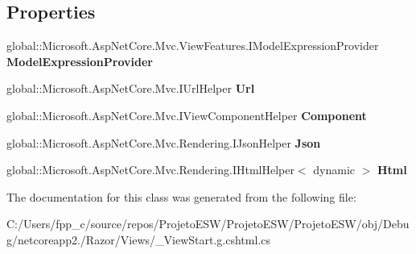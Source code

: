 \subsection*{Properties}
\begin{DoxyCompactItemize}
\item 
\mbox{\label{class_asp_net_core_1_1_views_____view_start_a7f11fba40cf2ab9a9a462e0b19145b58}} 
global\+::\+Microsoft.\+Asp\+Net\+Core.\+Mvc.\+View\+Features.\+I\+Model\+Expression\+Provider {\bfseries Model\+Expression\+Provider}
\item 
\mbox{\label{class_asp_net_core_1_1_views_____view_start_ac57e1ca15ac3b01991a05694676a3c3a}} 
global\+::\+Microsoft.\+Asp\+Net\+Core.\+Mvc.\+I\+Url\+Helper {\bfseries Url}
\item 
\mbox{\label{class_asp_net_core_1_1_views_____view_start_ae0ed9894fb347fee2d165a486dd788ad}} 
global\+::\+Microsoft.\+Asp\+Net\+Core.\+Mvc.\+I\+View\+Component\+Helper {\bfseries Component}
\item 
\mbox{\label{class_asp_net_core_1_1_views_____view_start_ac687c81863ee35c36cddd146799e20e1}} 
global\+::\+Microsoft.\+Asp\+Net\+Core.\+Mvc.\+Rendering.\+I\+Json\+Helper {\bfseries Json}
\item 
\mbox{\label{class_asp_net_core_1_1_views_____view_start_ae412ba155b0624d9a0d42ee19c5d5c61}} 
global\+::\+Microsoft.\+Asp\+Net\+Core.\+Mvc.\+Rendering.\+I\+Html\+Helper$<$ dynamic $>$ {\bfseries Html}
\end{DoxyCompactItemize}


The documentation for this class was generated from the following file\+:\begin{DoxyCompactItemize}
\item 
C\+:/\+Users/fpp\+\_\+c/source/repos/\+Projeto\+E\+S\+W/\+Projeto\+E\+S\+W/\+Projeto\+E\+S\+W/obj/\+Debug/netcoreapp2./\+Razor/\+Views/\+\_\+\+View\+Start.\+g.\+cshtml.\+cs\end{DoxyCompactItemize}
